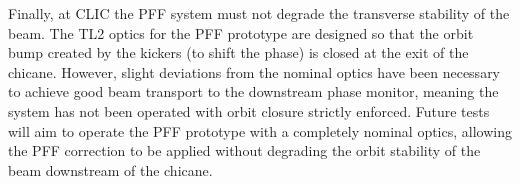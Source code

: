Finally, at CLIC the PFF system must not degrade the transverse stability of the beam. The TL2 optics for the PFF prototype are designed so that the orbit bump created by the kickers (to shift the phase) is closed at the exit of the chicane. However, slight deviations from the nominal optics have been necessary to achieve good beam transport to the downstream phase monitor, meaning the system has not been operated with orbit closure strictly enforced. Future tests will aim to operate the PFF prototype with a completely nominal optics, allowing the PFF correction to be applied without degrading the orbit stability of the beam downstream of the chicane.








